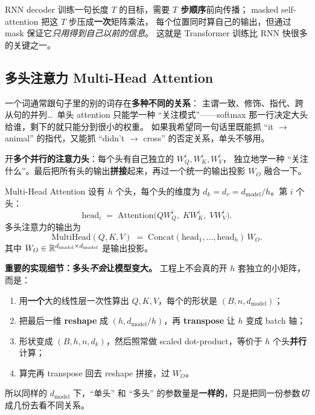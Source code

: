 \begin{remark}
RNN decoder 训练一句长度 $T$ 的目标，需要 \textbf{$T$ 步顺序}前向传播；
masked self-attention 把这 $T$ 步压成\textbf{一次}矩阵乘法，
每个位置同时算自己的输出，但通过 mask 保证它\emph{只用得到自己以前的信息}。
这就是 Transformer 训练比 RNN 快很多的关键之一。
\end{remark}

\subsection{多头注意力 Multi-Head Attention}
\label{subsec:ch03-mha}

\begin{problemblock}
一个词通常跟句子里的别的词存在\textbf{多种不同的关系}：
主谓一致、修饰、指代、跨从句的并列\ldots\
单头 attention 只能学一种 ``关注模式''——softmax 那一行决定大头给谁，剩下的就只能分到很小的权重。
如果我希望同一句话里既能抓 ``it $\to$ animal'' 的指代，又能抓 ``didn't $\to$ cross'' 的否定关系，单头不够用。
\end{problemblock}

\begin{intuitionblock}
开\textbf{多个并行的注意力头}：每个头有自己独立的 $W_Q^i, W_K^i, W_V^i$，
独立地学一种 ``关注什么''。最后把所有头的输出\textbf{拼接}起来，再过一个统一的输出投影 $W_O$ 融合一下。
\end{intuitionblock}

\begin{mathbox}{Multi-Head Attention}
设有 $h$ 个头，每个头的维度为 $d_k = d_v = d_{\text{model}} / h$。第 $i$ 个头：
\[
  \mathrm{head}_i \;=\; \mathrm{Attention}\!\bigl(Q W_Q^i,\; K W_K^i,\; V W_V^i\bigr).
\]
多头注意力的输出为
\[
  \mathrm{MultiHead}(Q, K, V)
  \;=\; \mathrm{Concat}(\mathrm{head}_1, \dots, \mathrm{head}_h)\, W_O .
\]
其中 $W_O \in \mathbb{R}^{d_{\text{model}} \times d_{\text{model}}}$ 是输出投影。
\end{mathbox}

\begin{engbox}
\textbf{重要的实现细节：多头\emph{不会}让模型变大。}
工程上不会真的开 $h$ 套独立的小矩阵，而是：
\begin{enumerate}
  \item 用\textbf{一个}大的线性层一次性算出 $Q, K, V$，每个的形状是 $(B, n, d_{\text{model}})$；
  \item 把最后一维 \textbf{reshape} 成 $(h, d_{\text{model}}/h)$，再 \textbf{transpose} 让 $h$ 变成 batch 轴；
  \item 形状变成 $(B, h, n, d_k)$，然后照常做 scaled dot-product，等价于 $h$ 个头\textbf{并行}计算；
  \item 算完再 transpose 回去 reshape 拼接，过 $W_O$。
\end{enumerate}
所以同样的 $d_{\text{model}}$ 下，``单头'' 和 ``多头'' 的参数量是\textbf{一样的}，只是把同一份参数\emph{切}成几份去看不同关系。
\end{engbox}

